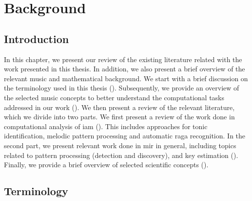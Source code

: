 
\chapter{Background}
\label{chap:background}

\section{Introduction}

In this chapter, we present our review of the existing literature related with the work presented in this thesis. In addition, we also present a brief overview of the relevant music and mathematical background. We start with a brief discussion on the terminology used in this thesis (). Subsequently, we provide an overview of the selected music concepts to better understand the computational tasks addressed in our work (). We then present a review of the relevant literature, which we divide into two parts. We first present a review of the work done in computational analysis of \gls{iam} (). This includes approaches for tonic identification, melodic pattern processing and automatic \gls{raga} recognition. In the second part, we present relevant work done in \gls{mir} in general, including topics related to pattern processing (detection and discovery), and key estimation (). Finally, we provide a brief overview of selected scientific concepts ().%



\section{Terminology}
\label{sec:background_terminology}

